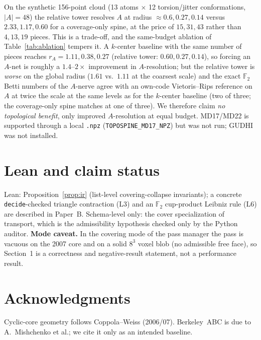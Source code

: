 \documentclass[11pt]{article}
\begin{document}


On the synthetic 156-point cloud (13 atoms $\times$ 12 torsion/jitter conformations,
$|A|=48$) the relative tower resolves $A$ at radius $\approx 0.6,0.27,0.14$ versus
$2.33,1.17,0.60$ for a coverage-only spine, at the price of $15,31,43$ rather
than $4,13,19$ pieces.  This is a trade-off, and the same-budget ablation of
Table~\ref{tab:ablation} tempers it.  A $k$-center baseline with the same number of
pieces reaches $r_A=1.11,0.38,0.27$ (relative tower: $0.60,0.27,0.14$), so forcing an
$A$-net is roughly a $1.4$--$2\times$ improvement in $A$-resolution; but the relative tower
is \emph{worse} on the global radius ($1.61$ vs.\ $1.11$ at the coarsest scale) and the
exact $\mathbb F_2$ Betti numbers of the $A$-nerve agree with an own-code Vietoris--Rips
reference on $A$ at twice the scale at the same levels as for the $k$-center baseline (two of three; the coverage-only spine matches at one of three).  We therefore
claim \emph{no topological benefit}, only improved $A$-resolution at equal budget.
MD17/MD22 is supported through a local \texttt{.npz} (\texttt{TOPOSPINE\_MD17\_NPZ}) but was
not run; GUDHI was not installed.



\section{Lean and claim status}
Lean: Proposition~\ref{prop:ir} (list-level covering-collapse invariants); a concrete
\texttt{decide}-checked triangle contraction (L3) and an $\mathbb F_2$ cup-product Leibniz
rule (L6) are described in Paper~B.  Schema-level only: the cover specialization of
transport, which is the admissibility hypothesis checked only by the Python auditor.
\textbf{Mode caveat.}  In the covering mode of the pass manager the pass is vacuous on the 2007
core and on a solid $8^3$ voxel blob (no admissible free face), so Section~1 is a
correctness and negative-result statement, not a performance result.

\section*{Acknowledgments}
Cyclic-core geometry follows Coppola--Weiss (2006/07).  Berkeley~ABC is due to
A.~Mishchenko et al.; we cite it only as an intended baseline.
\end{document}
